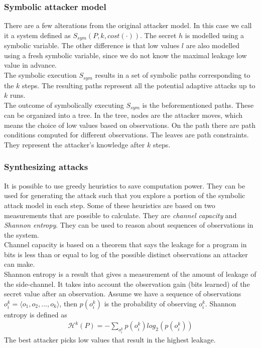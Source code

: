 \documentclass[11pt,a4paper,notitlepage]{article}
\begin{document}
\subsubsection{Symbolic attacker model}
There are a few alterations from the original attacker model. In this case we call it a system defined as $S_{sym}(P,k,cost(\cdot))$. The secret $h$ is modelled using a symbolic variable. The other difference is that low values $l$ are also modelled using a fresh symbolic variable, since we do not know the maximal leakage low value in advance.
\\The symbolic execution $S_{sym}$ results in a set of symbolic paths corresponding to the $k$ steps. The resulting paths represent all the potential adaptive attacks up to $k$ runs. 
\\The outcome of symbolically executing $S_{sym}$ is the beforementioned paths. These can be organized into a tree. In the tree, nodes are the attacker moves, which means the choice of low values based on observations. On the path there are path conditions computed for different observations. The leaves are path constraints. They represent the attacker's knowledge after $k$ steps. 

\subsubsection{Synthesizing attacks}
It is possible to use greedy heuristics to save computation power. They can be used for generating the attack such that you explore a portion of the symbolic attack model in each step. Some of these heuristics are based on two measurements that are possible to calculate. They are \textit{channel capacity} and \textit{Shannon entropy}. They can be used to reason about sequences of observations in the system. 
\\Channel capacity \cite{smithQIF} is based on a theorem that says the leakage for a program in bits is less than or equal to log of the possible distinct observations an attacker can make. 
\\Shannon entropy is a result that gives a measurement of the amount of leakage of the side-channel. It takes into account the observation gain (bits learned) of the secret value after an observation. Assume we have a sequence of observations $o_i^k = \langle o_1,o_2,...,o_k \rangle$, then $p(o_i^k)$ is the probability of observing $o_i^k$. Shannon entropy is defined as 
\begin{align*}
    \mathcal{H}^k(P) = -\sum_{o_i^k} p(o_i^k) log_2(p(o_i^k))
\end{align*}
The best attacker picks low values that result in the highest leakage.
\end{document}
